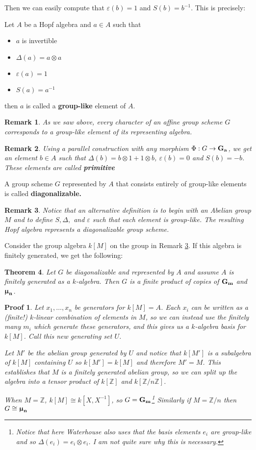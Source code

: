 \documentclass[12pt]{article}
\theoremstyle{nonumberbreak}
\theoremstyle{changebreak}
\newtheorem{thm}{Theorem}[subsection]
\theoremstyle{nonumberplain}
\newtheorem{prf}{Proof}
\theoremstyle{change}
\newtheorem{rmk}[thm]{Remark}
\newcommand*{\bbZ}{\mathbb{Z}}
\newcommand{\Ga}{\ensuremath\mathbf{G_a}}
\newcommand{\Gm}{\ensuremath\mathbf{G_m}}
\newcommand*{\mun}[1]{\ensuremath\mathbf{\bm\upmu_#1}}
\begin{document}
Then we can easily compute that $\varepsilon(b)=1$ and $S(b)=b^{-1}$. This is precisely:
\begin{defn}
	Let $A$ be a Hopf algebra and $a\in A$ such that
	\begin{itemize}
		\item $a$ is invertible
		\item $\Delta(a)=a\otimes a$
		\item $\varepsilon(a)=1$
		\item $S(a)=a^{-1}$
	\end{itemize}
	then $a$ is called a \textbf{group-like} element of $A$.
\end{defn}
\begin{rmk}
	As we saw above, every character of an affine group scheme $G$ corresponds to a 
	group-like element of its representing algebra.
\end{rmk}
\begin{rmk}
	Using a parallel construction with any morphism $\Phi:G\to\Ga$, we get an element $b\in A$
	such that $\Delta(b)=b\otimes 1+1\otimes b$, $\varepsilon(b)=0$ and $S(b)=-b$. These elements
	are called \textbf{primitive}
\end{rmk}

\begin{defn}
	A group scheme $G$ represented by $A$ that consists entirely of group-like elements is
	called \textbf{diagonalizable.}
\end{defn}
\begin{rmk}\label{rmk-diag}
	Notice that an alternative definition is to begin with an Abelian group $M$ and to 
	define $S,\Delta,$ and $\varepsilon$ such that each element is group-like. The resulting
	Hopf algebra represents a diagonalizable group scheme.
\end{rmk}

Consider the group algebra $k[M]$ on the group in Remark \ref{rmk-diag}. If this algebra
is finitely generated, we get the following:
\begin{thm}
	Let $G$ be diagonalizable and represented by $A$ and assume $A$ is finitely generated
	as a $k$-algebra. Then $G$ is a finite product of copies of $\Gm$ and $\mun n$.
\end{thm}
\begin{prf}
	Let $x_1,\dots, x_n$ be generators for $k[M]=A$. Each $x_i$ can be written as a (finite!)
	$k$-linear combination of elements in $M$, so we can instead use the finitely many $m_i$
	which generate these generators, and this gives us a $k$-algebra basis for $k[M]$. Call this
	new generating set $U$. 

	Let $M'$ be the abelian group generated by $U$ and notice that $k[M']$ is a subalgebra of
	$k[M]$ containing $U$ so $k[M']=k[M]$ and therefore $M'=M$. This establishes that $M$ is 
	a finitely generated abelian group, so we can split up the algebra into a tensor product
	of $k[\bbZ]$ and $k[\bbZ/n\bbZ]$.

	When $M=\bbZ$, $k[M]\cong k[X,X^{-1}]$, so $G= \Gm$\footnote{Notice that here Waterhouse also
	uses that the basis elements $e_i$ are group-like and so $\Delta(e_i)=e_i\otimes e_i$. I am not
	quite sure why this is necessary.} Similarly if $M=\bbZ/n$ then $G\cong \mun{n}$
\end{prf}
\end{document}
